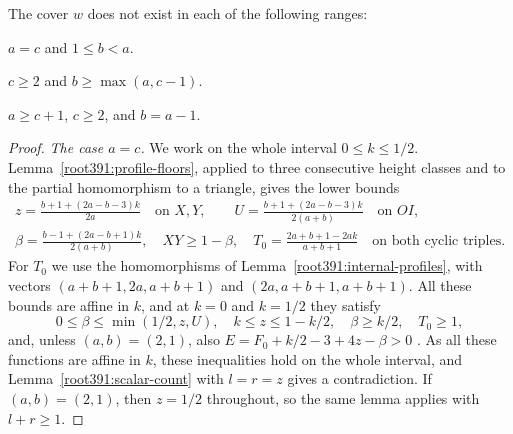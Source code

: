 \begin{lemma}
\label{stripbalance:factor}
\label{cheapedge:factor}
\label{endpointpair:factor}
The cover $w$ does not exist in each of the following ranges:
\begin{props}
\item\label{root406:equal-part}
$a=c$ and $1\le b<a$.

\item\label{root406:middle-heavy-part}
$c\ge2$ and $b\ge\max(a,c-1)$.

\item\label{root406:adjacent-part}
$a\ge c+1$, $c\ge2$, and $b=a-1$.
\end{props}
\end{lemma}
\begin{proof}
\emph{The case $a=c$.} We work on the whole interval $0\le k\le1/2$.
Lemma~\ref{root391:profile-floors}, applied to three consecutive height classes and to the partial homomorphism to a triangle, gives the lower bounds
\[
\begin{gathered}
 z=\frac{b+1+(2a-b-3)k}{2a}\quad\text{on }X,Y,\qquad
 U=\frac{b+1+(2a-b-3)k}{2(a+b)}\quad\text{on }OI,\\
 \beta=\frac{b-1+(2a-b+1)k}{2(a+b)},\quad XY\ge1-\beta,
 \quad T_0=\frac{2a+b+1-2ak}{a+b+1}
 \quad\text{on both cyclic triples}.
\end{gathered}
\]
For $T_0$ we use the homomorphisms of Lemma~\ref{root391:internal-profiles}, with vectors
$(a+b+1,2a,a+b+1)$ and $(2a,a+b+1,a+b+1)$.
All these bounds are affine in $k$, and at $k=0$ and $k=1/2$ they satisfy
\[
 0\le\beta\le\min(1/2,z,U),\quad k\le z\le1-k/2,\quad
 \beta\ge k/2,\quad T_0\ge1,
\]
and, unless $(a,b)=(2,1)$, also $E=F_0+k/2-3+4z-\beta>0$ .
As all these functions are affine in $k$, these inequalities hold on the whole interval, and
Lemma~\ref{root391:scalar-count} with $l=r=z$ gives a contradiction.
If $(a,b)=(2,1)$, then $z=1/2$ throughout, so the same lemma applies
with $l+r\ge1$.


\end{proof}
